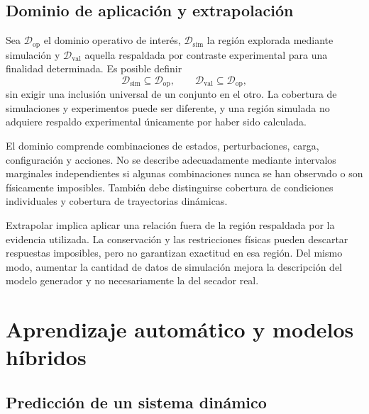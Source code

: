 \subsection{Dominio de aplicación y extrapolación}
\label{subsec:dominio_operacional_validez}

Sea $\mathcal D_{\mathrm{op}}$ el dominio operativo de interés, $\mathcal D_{\mathrm{sim}}$ la región explorada mediante simulación y $\mathcal D_{\mathrm{val}}$ aquella respaldada por contraste experimental para una finalidad determinada. Es posible definir
\begin{equation}
\mathcal D_{\mathrm{sim}}\subseteq\mathcal D_{\mathrm{op}},
\qquad
\mathcal D_{\mathrm{val}}\subseteq\mathcal D_{\mathrm{op}},
\label{eq:dominios_modelo}
\end{equation}
sin exigir una inclusión universal de un conjunto en el otro. La cobertura de simulaciones y experimentos puede ser diferente, y una región simulada no adquiere respaldo experimental únicamente por haber sido calculada.

El dominio comprende combinaciones de estados, perturbaciones, carga, configuración y acciones. No se describe adecuadamente mediante intervalos marginales independientes si algunas combinaciones nunca se han observado o son físicamente imposibles. También debe distinguirse cobertura de condiciones individuales y cobertura de trayectorias dinámicas.

Extrapolar implica aplicar una relación fuera de la región respaldada por la evidencia utilizada. La conservación y las restricciones físicas pueden descartar respuestas imposibles, pero no garantizan exactitud en esa región. Del mismo modo, aumentar la cantidad de datos de simulación mejora la descripción del modelo generador y no necesariamente la del secador real.

\section{Aprendizaje automático y modelos híbridos}
\label{sec:ml_procesos_termicos}

\subsection{Predicción de un sistema dinámico}

